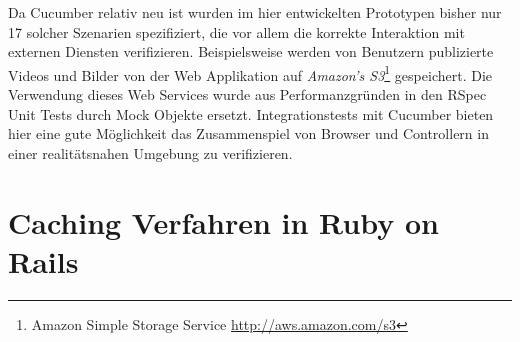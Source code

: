 Da Cucumber relativ neu ist wurden im hier entwickelten Prototypen
bisher nur 17 solcher Szenarien spezifiziert, die vor allem die
korrekte Interaktion mit externen Diensten
verifizieren. Beispielsweise werden von Benutzern publizierte Videos
und Bilder von der Web Applikation auf \textit{Amazon's
  S3}\footnote{Amazon Simple Storage Service
  \url{http://aws.amazon.com/s3}} gespeichert. Die Verwendung dieses
Web Services wurde aus Performanzgründen in den RSpec Unit Tests durch
Mock Objekte ersetzt. Integrationstests mit Cucumber bieten hier eine
gute Möglichkeit das Zusammenspiel von Browser und Controllern in
einer realitätsnahen Umgebung zu verifizieren.

\section{Caching Verfahren in Ruby on Rails}

